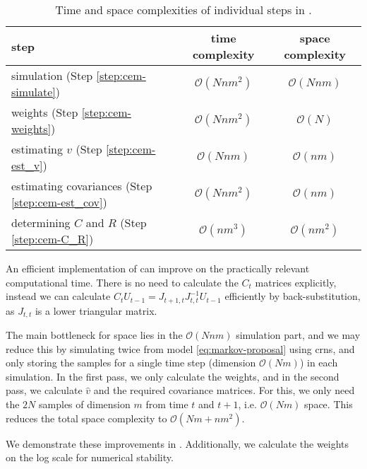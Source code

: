 \begin{table}
    \centering
    \begin{tabular}{lcc}
        \toprule
        step & time complexity & space complexity \\
        \midrule 
        simulation (Step \ref{step:cem-simulate}) & $\mathcal O \left( Nnm^{2}\right)$ & $\mathcal O \left( Nnm \right)$\\
        weights (Step \ref{step:cem-weights}) & $\mathcal O (Nnm^{2})$ & $\mathcal O \left( N \right)$\\
        estimating $v$ (Step \ref{step:cem-est_v}) & $\mathcal O (Nnm)$ & $\mathcal O \left( nm \right)$\\
        estimating covariances (Step \ref{step:cem-est_cov}) & $\mathcal O (Nnm^{2})$ & $\mathcal O \left( nm \right)$\\
        determining $C$ and $R$ (Step \ref{step:cem-C_R}) & $\mathcal O (nm^{3})$ & $\mathcal O (nm^{2})$\\
        \bottomrule
    \end{tabular}
    \caption{Time and space complexities of individual steps in .}
    \label{tab:cem-time-space-complexity}
\end{table}

An efficient implementation of  can improve on the practically relevant computational time. There is no need to calculate the $C_{t}$ matrices explicitly, instead we can calculate $C_{t}U_{t - 1} = J_{t + 1, t}J_{t,t}^{-1}U_{t - 1}$ efficiently by back-substitution, as $J_{t,t}$ is a lower triangular matrix. 

The main bottleneck for space lies in the $\mathcal O(Nnm)$ simulation part, and we may reduce this by simulating twice from model \eqref{eq:markov-proposal} using \glspl{crn}, and only storing the samples for a single time step (dimension $\mathcal O (Nm)$) in each simulation. In the first pass, we only calculate the weights, and in the second pass, we calculate $\hat v$ and the required covariance matrices. For this, we only need the $2N$ samples of dimension $m$ from time $t$ and $t + 1$, i.e. $\mathcal O(Nm)$ space. This reduces the total space complexity to $\mathcal O(Nm + nm^{2})$. 

We demonstrate these improvements in . Additionally, we calculate the weights on the log scale for numerical stability.

